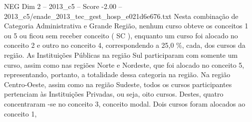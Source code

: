\begin{textsample}{NEG Dim 2 – 2013\_c5 – Score -2.00 – 2013\_c5/enade\_2013\_tec\_gest\_hosp\_e021d6e676.txt}
Nesta combinação de Categoria Administrativa e Grande Região, nenhum curso obteve os conceitos 1 ou 5 ou ficou sem receber conceito ( SC ), enquanto um curso foi alocado no conceito 2 e outro no conceito 4, correspondendo a 25,0 \%, cada, dos cursos da região.
As Instituições Públicas na região Sul participaram com somente um curso, assim como nas regiões Norte e Nordeste, que foi alocado no conceito 5, representando, portanto, a totalidade dessa categoria na região.
Na região Centro-Oeste, assim como na região Sudeste, todos os cursos participantes pertenciam às Instituições Privadas, ou seja, oito cursos.
Destes, quatro concentraram -se no conceito 3, conceito modal.
Dois cursos foram alocados ao conceito 1,

\end{textsample}
